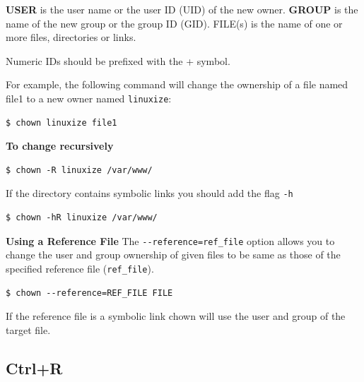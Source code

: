 \documentclass{article}
\newenvironment{blocktemplate}[1]{%
    \tcolorbox[beamer,%
    noparskip,breakable,
    colframe=Blue,%
    colbacklower=LimeGreen!75!LightGreen,%
    title=#1]}%
    {\endtcolorbox}
\newenvironment{blocktemplateII}[1]{%
    \tcolorbox[beamer,%
    noparskip,breakable,
    colframe=Green,%
    colbacklower=LimeGreen!75!LightGreen,%
    title=#1]}%
    {\endtcolorbox}
\newenvironment{blocktemplateIII}[1]{%
    \tcolorbox[beamer,%
    noparskip,breakable,
    ,colframe=Red,%
    colbacklower=LimeGreen!75!LightGreen,%
    title=#1]}%
    {\endtcolorbox}
\newenvironment{codetemplate}[1][]{%
  \mybasecolorbox[#1]
  \itshape
}{%
  \endmybasecolorbox
}
\begin{document}
\textbf{USER} is the user name or the user ID (UID) of the new owner. \textbf{GROUP} is the name of the new group or the group ID (GID). FILE(s) is the name of one or more files, directories or links.

\begin{blocktemplate}{NOTE}
Numeric IDs should be prefixed with the + symbol.
\end{blocktemplate}

For example, the following command will change the ownership of a file named file1 to a new owner named \verb|linuxize|:
\begin{codetemplate}{}
\begin{verbatim}
$ chown linuxize file1
\end{verbatim}
\end{codetemplate}

\textbf{To change recursively}
\begin{codetemplate}{}
\begin{verbatim}
$ chown -R linuxize /var/www/
\end{verbatim}
\end{codetemplate}

\begin{blocktemplateII}{NOTE}
If the directory contains symbolic links you should add the flag \verb|-h|
\begin{codetemplate}{}
\begin{verbatim}
$ chown -hR linuxize /var/www/
\end{verbatim}
\end{codetemplate}
\end{blocktemplateII}

\textbf{Using a Reference File}
The \verb|--reference=ref_file| option allows you to change the user and group ownership of given files to be same as those of the specified reference file (\verb|ref_file|). 
\begin{codetemplate}{}
\begin{verbatim}
$ chown --reference=REF_FILE FILE
\end{verbatim}
\end{codetemplate}

\begin{blocktemplateIII}{WARNING}
If the reference file is a symbolic link chown will use the user and group of the target file.
\end{blocktemplateIII}

\subsection{Ctrl+R}
\end{document}
